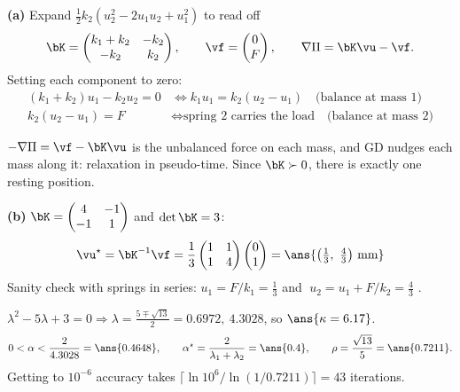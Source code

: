 \begin{frame}{}
  \textbf{(a)} Expand $\tfrac12k_2(u_2^2 - 2u_1u_2 + u_1^2)$ to read off
  \[
    \bK = \begin{pmatrix}k_1+k_2 & -k_2\\ -k_2 & k_2\end{pmatrix}, \qquad
    \vf = \begin{pmatrix}0\\ F\end{pmatrix}, \qquad
    \nabla\Pi = \bK\vu - \vf .
  \]
  Setting each component to zero:
  \begin{align*}
    (k_1+k_2)u_1 - k_2u_2 = 0 &\iff k_1u_1 = k_2(u_2-u_1) \quad\text{(balance at mass 1)}\\
    k_2(u_2 - u_1) = F &\iff \text{spring 2 carries the load} \quad\text{(balance at mass 2)}
  \end{align*}
  \begin{keybox}
    $-\nabla\Pi = \vf - \bK\vu$ is the \alert{unbalanced force} on each mass, and GD nudges each mass along it:
    relaxation in pseudo-time. Since $\bK\succ0$, there is exactly one resting position.
  \end{keybox}
\end{frame}

\begin{frame}{}
  \textbf{(b)} $\bK = \begin{pmatrix}4&-1\\-1&1\end{pmatrix}$ and $\det\bK = 3$:
  \[
    \vu^\star = \bK^{-1}\vf = \frac13\begin{pmatrix}1&1\\1&4\end{pmatrix}\begin{pmatrix}0\\1\end{pmatrix}
    = \ans{\bigl(\tfrac13,\ \tfrac43\bigr)\ \text{mm}}
  \]
  Sanity check with springs in series: $u_1 = F/k_1 = \tfrac13$ and $\;u_2 = u_1 + F/k_2 = \tfrac43$ \checkmark.

  \vspace{2pt}
  $\lambda^2 - 5\lambda + 3 = 0 \Rightarrow \lambda = \tfrac{5\mp\sqrt{13}}{2} = 0.6972,\ 4.3028$, so $\ans{\kappa = 6.17}$.
  \[
    0 < \alpha < \frac{2}{4.3028} = \ans{0.4648},\qquad
    \alpha^\star = \frac{2}{\lambda_1+\lambda_2} = \ans{0.4},\qquad
    \rho = \frac{\sqrt{13}}{5} = \ans{0.7211}.
  \]
  Getting to $10^{-6}$ accuracy takes $\lceil\ln10^6/\ln(1/0.7211)\rceil = 43$ iterations.
\end{frame}


